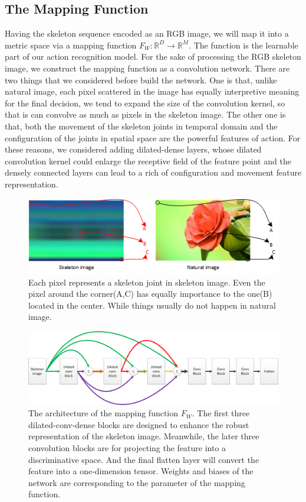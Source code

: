 \documentclass{bmvc2k}
\begin{document}
\subsection*{The Mapping Function}
Having the skeleton sequence encoded as an RGB image, we will map it into a metric space via a mapping function $F_W:\mathbb{R}^D\rightarrow \mathbb{R}^M$. The function is the learnable part of our action recognition model. For the sake of processing the RGB skeleton image, we construct the mapping function as a convolution network. There are two things that we considered before build the network. One is that, unlike natural image, each pixel scattered in the image has equally interpretive meaning for the final decision, we tend to expand the size of the convolution kernel, so that is can convolve as much as pixels in the skeleton image. The other one is that, both the movement of the skeleton joints in temporal domain and the configuration of the joints in spatial space are the powerful features of action. For these reasons, we considered adding dilated-dense layers, whose dilated convolution kernel could enlarge the receptive field of the feature point and the densely connected layers can lead to a rich of configuration and movement feature representation. 

\begin{figure}[htb] 
	\centering
	\includegraphics[scale=0.8]{images/Figure_3.png}
	\caption{Each pixel represents a skeleton joint in skeleton image. Even the pixel around the corner(A,C) has equally importance to the one(B) located in the center. While things usually do not happen in natural image.}
	\label{fig:3}	
\end{figure}

\begin{figure}[htb] 
	\centering
	\includegraphics[scale=0.2]{images/Figure_4.png}
	\caption{The architecture of the mapping function $F_W$. The first three dilated-conv-dense blocks are designed to enhance the robust representation of the skeleton image. Meanwhile, the later three convolution blocks are for projecting the feature into a discriminative space. And the final flatten layer will convert the feature into a one-dimension tensor. Weights and biases of the network are corresponding to the parameter of the mapping function.}
	\label{fig:4}	
\end{figure}
\end{document}
